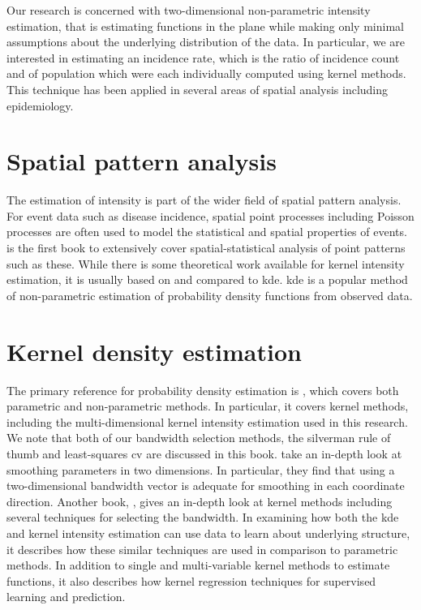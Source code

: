 

Our research is concerned with two-dimensional non-parametric intensity estimation,
that is estimating functions in the plane while making only minimal assumptions about the underlying distribution of the data. 
In particular, we are interested in estimating an incidence rate,
which is the ratio of incidence count and of population which were each individually computed using kernel methods.
This technique has been applied in several areas of spatial analysis including epidemiology.

\section{Spatial pattern analysis}

The estimation of intensity is part of the wider field of spatial pattern analysis.
For event data such as disease incidence,
spatial point processes including Poisson processes are often used to model the statistical and spatial properties of events.
 is the first book to extensively cover spatial-statistical analysis of point patterns such as these.
While there is some theoretical work available for \gls{kernel intensity estimation},
it is usually based on and compared to \acrfull{kde}.
\Gls{kde} is a popular method of non-parametric estimation of probability density functions from observed data.

\section{Kernel density estimation}
 
The primary reference for probability density estimation is \citep{silverman1986density},
which covers both parametric and non-parametric methods.
In particular,
it covers kernel methods,
including the multi-dimensional \gls{kernel intensity estimation} used in this research.
We note that both of our bandwidth selection methods,
the \Gls{silverman} rule of thumb and least-squares \acrlong{cv} are discussed in this book.
 take an in-depth look at smoothing parameters in two dimensions.
In particular,
they find that using a two-dimensional bandwidth vector is adequate for smoothing in each coordinate direction.
Another book, \citet{wand1994kernel}, gives an in-depth look at kernel methods
including several techniques for selecting the bandwidth.
In examining how both the \gls{kde} and \gls{kernel intensity estimation} can use data to learn about underlying structure,
it describes how these similar techniques are used in comparison to parametric methods.
In addition to single and multi-variable kernel methods to estimate functions,
it also describes how kernel regression techniques for supervised learning and prediction.

